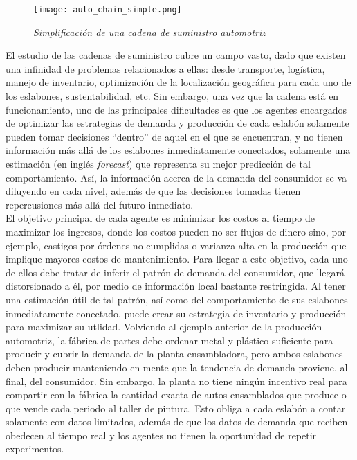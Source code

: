 \begin{figure}[ht]
\caption{\textit{Simplificaci\'on de una cadena de suministro automotriz}}
\label{automotriz}
\texttt{[image: auto\_chain\_simple.png]}
\centering
\end{figure}


El estudio de las cadenas de suministro cubre un campo vasto, dado que existen una infinidad de problemas relacionados a ellas: desde transporte, log\'istica, manejo de inventario, optimizaci\'on de la localizaci\'on geogr\'afica para cada uno de los eslabones, sustentabilidad, etc. Sin embargo, una vez que la cadena est\'a en funcionamiento, uno de las principales dificultades es que los agentes encargados de optimizar las estrategias de demanda y producci\'on de cada eslab\'on solamente pueden tomar decisiones ``dentro'' de aquel en el que se encuentran, y no tienen informaci\'on m\'as all\'a de los eslabones inmediatamente conectados, solamente una estimaci\'on (en ingl\'es \textit{forecast}) que representa su mejor predicci\'on de tal comportamiento. As\'i, la informaci\'on acerca de la demanda del consumidor se va diluyendo en cada nivel, además de que las decisiones tomadas tienen repercusiones m\'as all\'a del futuro inmediato. \\

El objetivo principal de cada agente es minimizar los costos al tiempo de maximizar los ingresos, donde los costos pueden no ser flujos de dinero sino, por ejemplo, castigos por \'ordenes no cumplidas o varianza alta en la producci\'on que implique mayores costos de mantenimiento. Para llegar a este objetivo, cada uno de ellos debe tratar de inferir el patr\'on de demanda del consumidor, que llegar\'a distorsionado a \'el, por medio de información local bastante restringida. Al tener una estimaci\'on \'util de tal patr\'on, as\'i como del comportamiento de sus eslabones inmediatamente conectado, puede crear su estrategia de inventario y producci\'on para maximizar su utlidad. Volviendo al ejemplo anterior de la producci\'on automotriz, la f\'abrica de partes debe ordenar metal y pl\'astico suficiente para producir y cubrir la demanda de la planta ensambladora, pero ambos eslabones deben producir manteniendo en mente que la tendencia de demanda proviene, al final, del consumidor. Sin embargo, la planta no tiene ning\'un incentivo real para compartir con la f\'abrica la cantidad exacta de autos ensamblados que produce o que vende cada periodo al taller de pintura. Esto obliga a cada eslab\'on a contar solamente con datos limitados, adem\'as de que los datos de demanda que reciben obedecen al tiempo real y los agentes no tienen la oportunidad de repetir experimentos.\\

